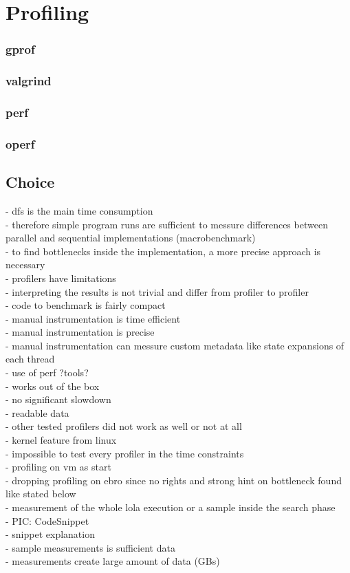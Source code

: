 \section{Profiling}
\subsubsection{gprof}
\subsubsection{valgrind}
\subsubsection{perf}
\subsubsection{operf}
\subsection{Choice}
- dfs is the main time consumption\\
- therefore simple program runs are sufficient to messure differences between parallel and sequential implementations (macrobenchmark)\\
- to find bottlenecks inside the implementation, a more precise approach is necessary\\
- profilers have limitations\\
- interpreting the results is not trivial and differ from profiler to profiler\\
- code to benchmark is fairly compact\\
- manual instrumentation is time efficient\\
- manual instrumentation is precise\\
- manual instrumentation can messure custom metadata like state expansions of each thread\\


- use of perf ?tools?\\%
- works out of the box\\%
- no significant slowdown\\
- readable data\\
- other tested profilers did not work as well or not at all\\
- kernel feature from linux\\
- impossible to test every profiler in the time constraints\\
- profiling on vm as start\\%
- dropping profiling on ebro since no rights and strong hint on bottleneck found like stated below\\%
- measurement of the whole lola execution or a sample inside the search phase\\%
- PIC: CodeSnippet\\
- snippet explanation\\
- sample measurements is sufficient data\\ %
- measurements create large amount of data (GBs)\\

